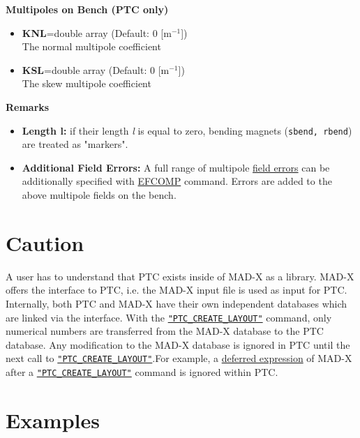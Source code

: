 {\bf Multipoles on Bench  (PTC only)} \\ 
\begin{itemize}
  \item {\bf KNL}=double array (Default: 0   [m$^{-1}$]) \\
    The normal multipole coefficient 
  \item {\bf KSL}=double array (Default: 0   [m$^{-1}$]) \\
    The skew multipole coefficient 
\end{itemize}
        
{\bf Remarks} \\

\begin{itemize}
   \item {\bf Length l:} if their length \textit{l} is equal to zero,
     bending magnets (\texttt{sbend, rbend}) are treated as "markers". 
     
   \item {\bf Additional Field Errors:} A full range of multipole
     \href{../error/error_field.html}{ field errors} can be
     additionally specified with
     \href{../error/error_field.html#efcomp}{ EFCOMP} command. Errors
     are added to the above multipole fields on the bench. 
\end{itemize}

\section{Caution}

A user has to understand that PTC exists inside of MAD-X as a
library. MAD-X offers the interface to PTC, i.e. the MAD-X input file is
used as input for PTC. Internally, both PTC and MAD-X have their own
independent databases which are linked via the interface. With the
\texttt{\hyperlink{PTC_CREATE_LAYOUT}{"PTC\_CREATE\_LAYOUT"}} command,
only numerical numbers are transferred from the MAD-X database to the
PTC database. Any modification to the MAD-X database is ignored in PTC
until the next call to
\texttt{\hyperlink{PTC_CREATE_LAYOUT}{"PTC\_CREATE\_LAYOUT"}}.For
example, a \href{../Introduction/expression.html#defer}{deferred
  expression} of MAD-X after a
\texttt{\hyperlink{PTC_CREATE_LAYOUT}{"PTC\_CREATE\_LAYOUT"}} command is
ignored within PTC.  


\section{Examples}

